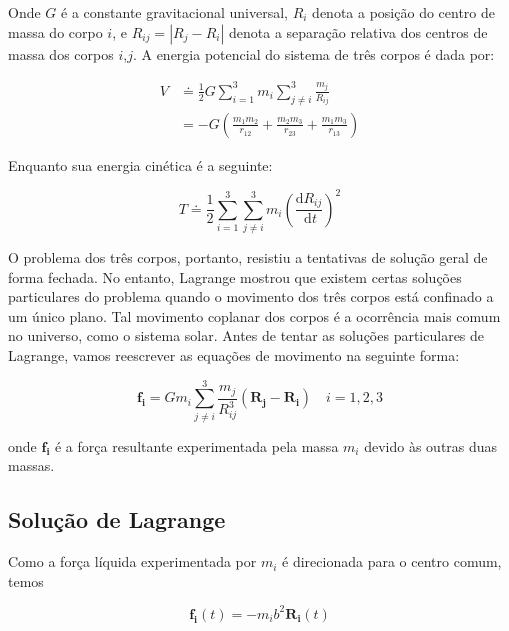 Onde $G$ é a constante gravitacional universal, $R_i$ denota a posição do centro de massa do corpo $i$, e $R_{ij} = |R_j − R_i| $ denota a separação relativa dos centros de massa dos corpos $i$,$j$. A energia potencial do sistema de três corpos é dada por:


\begin{equation}
\begin{aligned}
V & \doteq \frac{1}{2} G \sum_{i=1}^3 m_i \sum_{j \neq i}^3 \frac{m_j}{R_{i j}} \\
& =-G\left(\frac{m_1 m_2}{r_{12}}+\frac{m_2 m_3}{r_{23}}+\frac{m_1 m_3}{r_{13}}\right)
\label{eq:7.2T}
\end{aligned}
\end{equation}


Enquanto sua energia cinética é a seguinte:

\begin{equation}
T \doteq \frac{1}{2} \sum_{i=1}^3 \sum_{j \neq i}^3 m_i\left(\frac{\mathrm{d} R_{i j}}{\mathrm{~d} t}\right)^2
\label{eq:7.3T}
\end{equation}

O problema dos três corpos, portanto, resistiu a tentativas de solução geral de forma fechada. No entanto, Lagrange mostrou que existem certas soluções particulares do problema quando o movimento dos três corpos está confinado a um único plano. Tal movimento coplanar dos corpos é a ocorrência mais comum no universo, como o sistema solar. Antes de tentar as soluções particulares de Lagrange, vamos reescrever as equações de movimento na seguinte forma:

\begin{equation}
\mathbf{f}_{\mathbf{i}}=G m_i \sum_{j \neq i}^3 \frac{m_j}{R_{i j}^3}\left(\mathbf{R}_{\mathbf{j}}-\mathbf{R}_{\mathbf{i}}\right) \quad i=1,2,3
\label{eq:7.4T}
\end{equation}

onde $\mathbf{f_{i}}$ é a força resultante experimentada pela massa $m_i$ devido às outras duas massas.

\subsection{Solução de Lagrange}

Como a força líquida experimentada por $m_i$ é direcionada para o centro comum, temos

\begin{equation}
\textbf{f}_\mathbf{i}(t)=-m_i b^2\textbf{R}_\mathbf{i}(t)
\label{eq:7.15T}
\end{equation}


